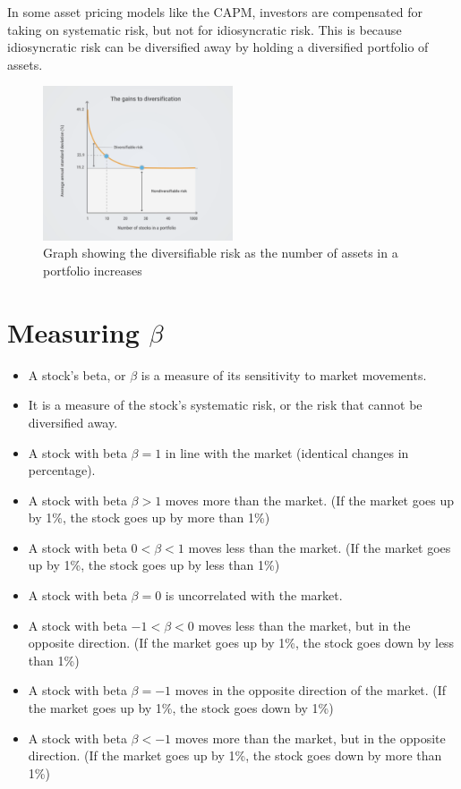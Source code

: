In some asset pricing models like the CAPM, investors are compensated for taking on systematic risk, but not for idiosyncratic risk. This is because idiosyncratic risk can be diversified away by holding a diversified portfolio of assets.\\

\begin{figure}[H]
    \centering
    \includegraphics[width=0.5\textwidth]{img/6.2.4.png}
    \caption{Graph showing the diversifiable risk as the number of assets in a portfolio increases}
    \label{fig:diversified_risk}    
\end{figure}

\section{Measuring $\beta$}
\begin{itemize}
    \item A stock's beta, or $\beta$ is a measure of its sensitivity to market movements. 
    \item It is a measure of the stock's systematic risk, or the risk that cannot be diversified away. 
    \item A stock with beta $\beta=1$ in line with the market (identical changes in percentage).
    \item A stock with beta $\beta>1$ moves more than the market. (If the market goes up by 1\%, the stock goes up by more than 1\%)
    \item A stock with beta $0<\beta<1$ moves less than the market. (If the market goes up by 1\%, the stock goes up by less than 1\%)
    \item A stock with beta $\beta=0$ is uncorrelated with the market.
    \item A stock with beta $-1<\beta<0$ moves less than the market, but in the opposite direction. (If the market goes up by 1\%, the stock goes down by less than 1\%)
    \item A stock with beta $\beta=-1$ moves in the opposite direction of the market. (If the market goes up by 1\%, the stock goes down by 1\%)
    \item A stock with beta $\beta<-1$ moves more than the market, but in the opposite direction. (If the market goes up by 1\%, the stock goes down by more than 1\%)

\end{itemize}

